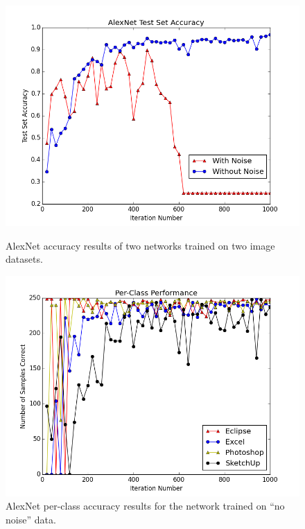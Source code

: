 \documentclass[10pt]{article}
\begin{document}
\begin{figure}[t]
\centering
  \begin{minipage}{.4\textwidth}
  \centering
  \includegraphics[width=1\linewidth]{AlexNet_Accuracy1000}
  \caption{AlexNet accuracy results of two networks trained on two image datasets.}
  \label{fig:alex_net}
  \end{minipage}\hfill
  \begin{minipage}{.4\textwidth}
  \centering
  \includegraphics[width=1\linewidth]{PerClassPerformance1000}
  \caption{AlexNet per-class accuracy results for the network trained on ``no noise'' data.}
  \label{fig:per_class}
  \end{minipage}
\end{figure}
\end{document}
